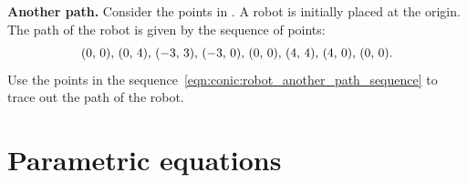 \documentclass[a4paper,oneside,12pt]{article}
\begin{document}
\begin{exercise}
\textbf{Another path.}
Consider the points in .  A robot is
initially placed at the origin.  The path of the robot is given by the
sequence of points:
\begin{equation}
\label{eqn:conic:robot_another_path_sequence}
\tuple{0}{0}\comma
\tuple{0}{4}\comma
\tuple{-3}{3}\comma
\tuple{-3}{0}\comma
\tuple{0}{0}\comma
\tuple{4}{4}\comma
\tuple{4}{0}\comma
\tuple{0}{0}.
\end{equation}
Use the points in the
sequence~\eqref{eqn:conic:robot_another_path_sequence} to trace out
the path of the robot.
\end{exercise}




\section{Parametric equations}
\end{document}
